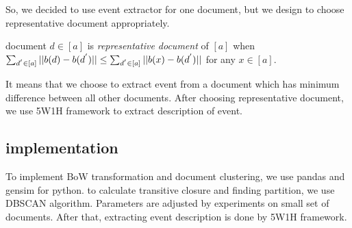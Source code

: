 So, we decided to use event extractor for one document, but we design to choose
representative document appropriately.

\begin{definition}
    document $d \in [a]$ is \textit{representative document} of $[a]$ when
    $\sum_{d^{'} \in [a]} ||b(d) - b(d^{'})|| \\ \leq \sum_{d^{'} \in [a]} ||b(x) - b(d^{'})||$ 
    for any $x \in [a]$.
\end{definition}

It means that we choose to extract event from a document which has
minimum difference between all other documents. After choosing representative
document, we use 5W1H framework to extract description of event.

\subsection{implementation}

To implement BoW transformation and document clustering, we use pandas and gensim for python.
to calculate transitive closure and finding partition, we use DBSCAN algorithm. Parameters
are adjusted by experiments on small set of documents. After that, extracting event
description is done by 5W1H framework.
